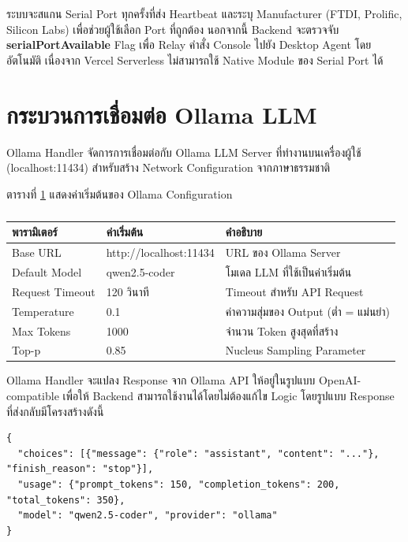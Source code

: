 \hspace*{1.3em}
ระบบจะสแกน Serial Port ทุกครั้งที่ส่ง Heartbeat และระบุ Manufacturer (FTDI, Prolific, Silicon Labs) เพื่อช่วยผู้ใช้เลือก Port ที่ถูกต้อง นอกจากนี้ Backend จะตรวจจับ \textbf{serialPortAvailable} Flag เพื่อ Relay คำสั่ง Console ไปยัง Desktop Agent โดยอัตโนมัติ เนื่องจาก Vercel Serverless ไม่สามารถใช้ Native Module ของ Serial Port ได้

\section{กระบวนการเชื่อมต่อ Ollama LLM}
\hspace*{1.3em}
Ollama Handler จัดการการเชื่อมต่อกับ Ollama LLM Server ที่ทำงานบนเครื่องผู้ใช้ (localhost:11434) สำหรับสร้าง Network Configuration จากภาษาธรรมชาติ

\hspace*{1.3em}
ตารางที่ \ref{tabD2:OllamaConfig} แสดงค่าเริ่มต้นของ Ollama Configuration

\begin{table}[H]
\centering
\caption{}
\label{tabD2:OllamaConfig}
\fontSixTeen
\begin{tabularx}{\textwidth}{|l|l|X|}
\hline
\textbf{พารามิเตอร์} & \textbf{ค่าเริ่มต้น} & \textbf{คำอธิบาย} \\
\hline
Base URL & http://localhost:11434 & URL ของ Ollama Server \\
\hline
Default Model & qwen2.5-coder & โมเดล LLM ที่ใช้เป็นค่าเริ่มต้น \\
\hline
Request Timeout & 120 วินาที & Timeout สำหรับ API Request \\
\hline
Temperature & 0.1 & ค่าความสุ่มของ Output (ต่ำ = แม่นยำ) \\
\hline
Max Tokens & 1000 & จำนวน Token สูงสุดที่สร้าง \\
\hline
Top-p & 0.85 & Nucleus Sampling Parameter \\
\hline
\end{tabularx}
\end{table}

\hspace*{1.3em}
Ollama Handler จะแปลง Response จาก Ollama API ให้อยู่ในรูปแบบ OpenAI-compatible เพื่อให้ Backend สามารถใช้งานได้โดยไม่ต้องแก้ไข Logic โดยรูปแบบ Response ที่ส่งกลับมีโครงสร้างดังนี้

{\fontsize{13}{14}\selectfont
\begin{verbatim}
{
  "choices": [{"message": {"role": "assistant", "content": "..."}, "finish_reason": "stop"}],
  "usage": {"prompt_tokens": 150, "completion_tokens": 200, "total_tokens": 350},
  "model": "qwen2.5-coder", "provider": "ollama"
}
\end{verbatim}
}

